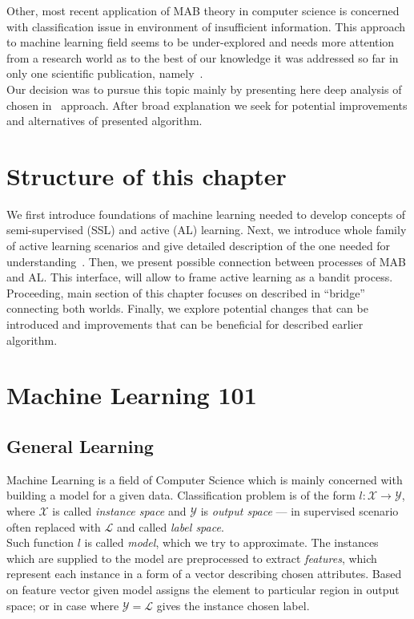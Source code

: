 \documentclass[12pt, a4paper, pdflatex, leqno]{report}
\begin{document}
Other, most recent application of MAB theory in computer science is concerned with classification issue in environment of insufficient information. This approach to machine learning field seems to be under-explored and needs more attention from a research world as to the best of our knowledge it was addressed so far in only one scientific publication, namely~\citep{DBLP:journals/corr/GantiG13}.\\
Our decision was to pursue this topic mainly by presenting here deep analysis of chosen in~\citep{DBLP:journals/corr/GantiG13} approach. After broad explanation we seek for potential improvements and alternatives of presented algorithm.

\section{Structure of this chapter}
We first introduce foundations of machine learning needed to develop concepts of semi-supervised (SSL) and active (AL) learning. Next, we introduce whole family of active learning scenarios and give detailed description of the one needed for understanding~\citep{DBLP:journals/corr/GantiG13}. Then, we present possible connection between processes of MAB and AL. This interface, will allow to frame active learning as a bandit process.\\
Proceeding, main section of this chapter focuses on described in \citep{DBLP:journals/corr/GantiG13} ``bridge'' connecting both worlds. Finally, we explore potential changes that can be introduced and improvements that can be beneficial for described earlier algorithm.

\section{Machine Learning 101}
\subsection{General Learning}
Machine Learning is a field of Computer Science which is mainly concerned with building a model for a given data. Classification problem is of the form $\mathit{l} : \mathscr{X} \rightarrow \mathscr{Y}$, where $\mathscr{X}$ is called \emph{instance space} and $\mathscr{Y}$ is \emph{output space} --- in supervised scenario often replaced with $\mathscr{L}$ and called \emph{label space}.\\
Such function $\mathit{l}$ is called \emph{model}, which we try to approximate. The instances which are supplied to the model are preprocessed to extract \emph{features}, which represent each instance in a form of a vector describing chosen attributes. Based on feature vector given model assigns the element to particular region in output space; or in case where $\mathscr{Y} = \mathscr{L}$ gives the instance chosen label.\\
\end{document}
